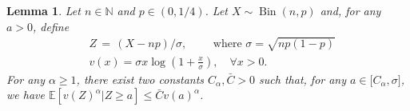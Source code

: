 \documentclass{article}
\newtheorem{lemma}{Lemma}
\begin{document}
\begin{lemma}\label{lemma17_LiuGaoSamworth}
Let $n \in \mathbb N$ and $p \in (0,1/4)$. 
Let $X \sim \operatorname{Bin}(n,p)$ and, for any $a>0$,  define 
\begin{align*}
    &Z \,=\, (X-np)/\sigma, \qquad \text{ where } \sigma = \sqrt{np(1-p)}\\
    &v(x)  = \sigma x \log\left(1+ \frac{x}{\sigma}\right), \quad \forall x > 0.
\end{align*}
For any $\alpha\geq 1$, there exist two constants $C_\alpha, \bar C>0$ such that, for any $a \in\big[C_\alpha, \sigma\big]$, we have $\mathbb E\left[v(Z)^{\alpha} \big|Z\geq a\right] \leq \bar C v(a)^{\alpha}$. %
\end{lemma}
\end{document}
